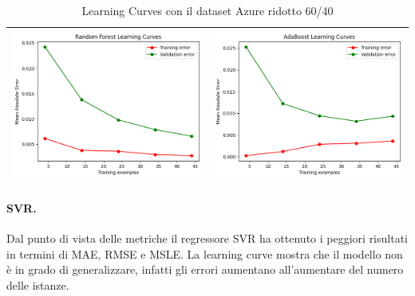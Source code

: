 \begin{table}[H]
\begin{tabularx}{\textwidth}{|X|X|}
        \includegraphics[width=\linewidth, trim=0 0 0 0]{images/RandomForest_lc60_ridottoAzure.png} &
        \includegraphics[width=\linewidth, trim=0 0 0 0]{images/AdaBoost_lc60_ridottoAzure.png} \\
        \hline
    \end{tabularx}
    \caption{Learning Curves con il dataset Azure ridotto 60/40}
    \label{tab:emissions_info}
\end{table}

\paragraph{\textbf{SVR}.}
Dal punto di vista delle metriche il regressore SVR ha ottenuto i peggiori risultati in termini di MAE, RMSE e MSLE. La learning curve mostra che il modello non è in grado di generalizzare, infatti gli errori aumentano all'aumentare del numero delle istanze.

